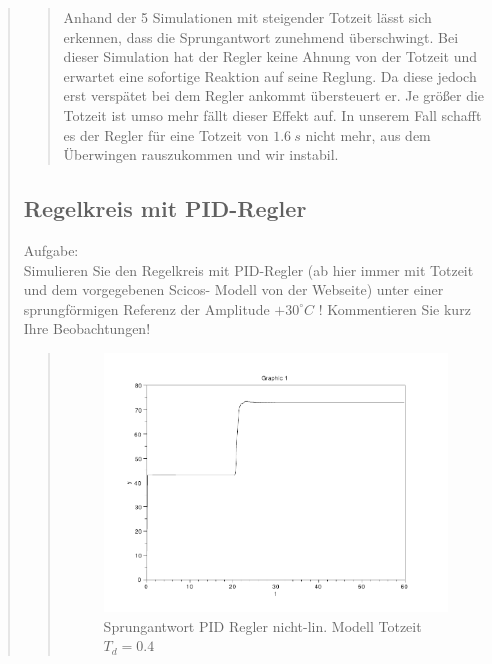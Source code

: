 \begin{quote}
\begin{quote}
        Anhand der 5 Simulationen mit steigender Totzeit lässt sich erkennen, dass die Sprungantwort zunehmend
        überschwingt. Bei dieser Simulation hat der Regler keine Ahnung von der Totzeit und erwartet eine sofortige
        Reaktion auf seine Reglung. Da diese jedoch erst verspätet bei dem Regler ankommt übersteuert er. Je größer die
        Totzeit ist umso mehr fällt dieser Effekt auf. In unserem Fall schafft es der Regler für eine Totzeit von $1.6
        \ s$ nicht mehr, aus dem Überwingen rauszukommen und wir instabil.
    

    \end{quote}
    
    \subsection{Regelkreis mit PID-Regler}
    Aufgabe:\\
    Simulieren Sie den Regelkreis mit PID-Regler (ab hier immer mit Totzeit und dem vorgegebenen Scicos- Modell von der
    Webseite) unter einer sprungförmigen Referenz der Amplitude $+30^{\circ}C$ ! Kommentieren Sie kurz Ihre
    Beobachtungen!\vspace{1em}
    
    \begin{quote}
        \begin{figure}[H]
        \centering
            \includegraphics[scale=0.7, trim = 0cm 0cm 0cm 0cm, clip]{./Bilder/4_2_Td_04}
                \caption{Sprungantwort PID Regler nicht-lin. Modell Totzeit $T_d = 0.4$}
        \end{figure}
    

\end{quote}
\end{quote}
